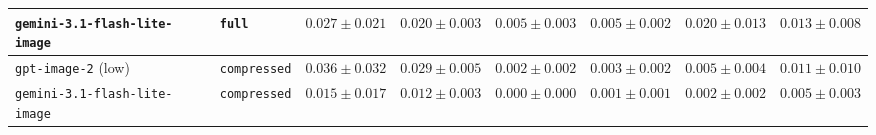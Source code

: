 \begin{table}[p]
\begin{adjustbox}{max width=\textwidth}
\begin{tabular}{@{}llrrrrrr@{}}
    \texttt{gemini-3.1-flash-lite-image} & \texttt{full} & $0.027 \pm 0.021$ & $0.020 \pm 0.003$ & $0.005 \pm 0.003$ & $0.005 \pm 0.002$ & $0.020 \pm 0.013$ & $0.013 \pm 0.008$ \\
    \midrule
    \texttt{gpt-image-2} (low) & \texttt{compressed} & $0.036 \pm 0.032$ & $0.029 \pm 0.005$ & $0.002 \pm 0.002$ & $0.003 \pm 0.002$ & $0.005 \pm 0.004$ & $0.011 \pm 0.010$ \\
    \texttt{gemini-3.1-flash-lite-image} & \texttt{compressed} & $0.015 \pm 0.017$ & $0.012 \pm 0.003$ & $0.000 \pm 0.000$ & $0.001 \pm 0.001$ & $0.002 \pm 0.002$ & $0.005 \pm 0.003$ \\
    \bottomrule
\end{tabular}
\end{adjustbox}
\end{table}


